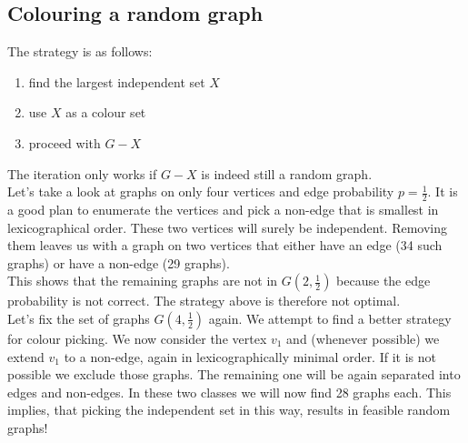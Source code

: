 \documentclass[a4paper, 12pt]{article}
\begin{document}
	\subsection{Colouring a random graph}
	The strategy is as follows: \begin{enumerate}
		\item find the largest independent set $X$
		\item use $X$ as a colour set
		\item proceed with $G-X$
	\end{enumerate}
	The iteration only works if $G-X$ is indeed still a random graph.\\
	
	Let's take a look at graphs on only four vertices and edge probability $p = \frac{1}{2}$.
	It is a good plan to enumerate the vertices and pick a non-edge that is smallest in lexicographical order. These two vertices will surely be independent. Removing them leaves us with a graph on two vertices that either have an edge (34 such graphs) or have a non-edge (29 graphs).\\
	This shows that the remaining graphs are not in $G(2,\frac{1}{2})$ because the edge probability is not correct. The strategy above is therefore not optimal.\\
	
	Let's fix the set of graphs $G(4,\frac{1}{2})$ again. We attempt to find a better strategy for colour picking. We now consider the vertex $v_1$ and (whenever possible) we extend $v_1$ to a non-edge, again in lexicographically minimal order. If it is not possible we exclude those graphs. The remaining one will be again separated into edges and non-edges. In these two classes we will now find 28 graphs each. This implies, that picking the independent set in this way, results in feasible random graphs!\\
	
\end{document}
